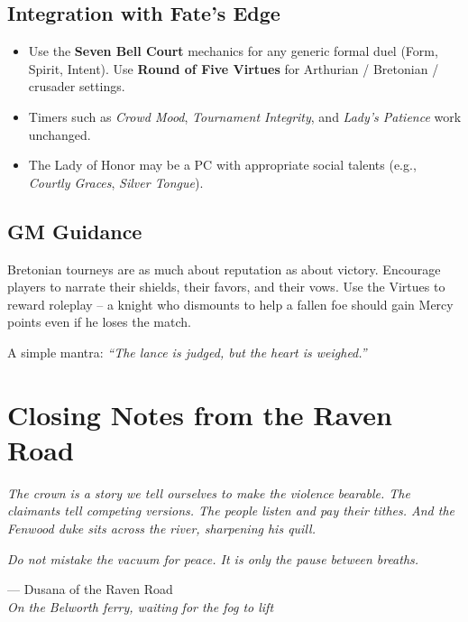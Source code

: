 \documentclass[11pt,twoside]{book}
\begin{document}
\subsection*{Integration with Fate's Edge}
\begin{itemize}
    \item Use the \textbf{Seven Bell Court} mechanics for any generic formal duel (Form, Spirit, Intent). Use \textbf{Round of Five Virtues} for Arthurian / Bretonian / crusader settings.
    \item Timers such as \textit{Crowd Mood}, \textit{Tournament Integrity}, and \textit{Lady's Patience} work unchanged.
    \item The Lady of Honor may be a PC with appropriate social talents (e.g., \textit{Courtly Graces}, \textit{Silver Tongue}).
\end{itemize}

\subsection*{GM Guidance}
Bretonian tourneys are as much about reputation as about victory. Encourage players to narrate their shields, their favors, and their vows. Use the Virtues to reward roleplay -- a knight who dismounts to help a fallen foe should gain Mercy points even if he loses the match.

A simple mantra: \emph{``The lance is judged, but the heart is weighed.''}

\section*{Closing Notes from the Raven Road}

\textit{The crown is a story we tell ourselves to make the violence bearable. The claimants tell competing versions. The people listen and pay their tithes. And the Fenwood duke sits across the river, sharpening his quill.}

\textit{Do not mistake the vacuum for peace. It is only the pause between breaths.}

\vspace{1em}
\noindent
--- Dusana of the Raven Road \\
\textit{On the Belworth ferry, waiting for the fog to lift}


\end{document}
